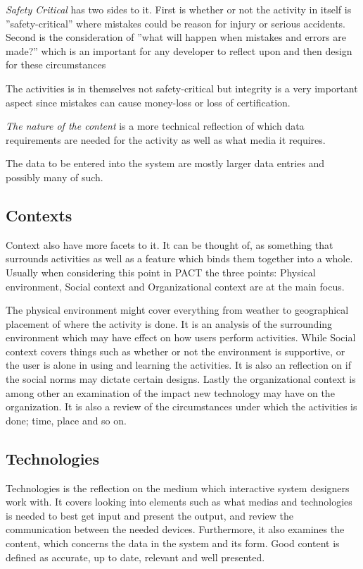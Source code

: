 \textit{Safety Critical} has two sides to it.
First is whether or not the activity in itself is ''safety-critical'' where mistakes could be reason for injury or serious accidents.
Second is the consideration of ''what will happen when mistakes and errors are made?'' which is an important for any developer to reflect upon and then design for these circumstances

The activities is in themselves not safety-critical but integrity is a very important aspect since mistakes can cause money-loss or loss of certification.

\textit{The nature of the content} is a more technical reflection of which data requirements are needed for the activity as well as what media it requires.

The data to be entered into the system are mostly larger data entries and possibly many of such.

\subsection{Contexts}
Context also have more facets to it.
It can be thought of, as something that surrounds activities as well as a feature which binds them together into a whole.
Usually when considering this point in PACT the three points: Physical environment, Social context and Organizational context are at the main focus.

The physical environment might cover everything from weather to geographical placement of where the activity is done. 
It is an analysis of the surrounding environment which may have effect on how users perform activities.
While Social context covers things such as whether or not the environment is supportive, or the user is alone in using and learning the activities. 
It is also an reflection on if the social norms may dictate certain designs.
Lastly the organizational context is among other an examination of the impact new technology may have on the organization. 
It is also a review of the circumstances under which the activities is done; time, place and so on.

\subsection{Technologies}
Technologies is the reflection on the medium which interactive system designers work with.
It covers looking into elements such as what medias and technologies is needed to best get input and present the output, and review the communication between the needed devices.
Furthermore, it also examines the content, which concerns the data in the system and its form.
Good content is defined as accurate, up to date, relevant and well presented.


